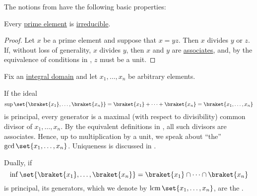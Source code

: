 \begin{proposition}\label{thm:def:domain_divisibility/properties}
  The notions from  have the following basic properties:
  \begin{thmenum}
     Every \hyperref[def:domain_divisibility/prime]{prime element} is \hyperref[def:domain_divisibility/irreducible]{irreducible}.
  \end{thmenum}
\end{proposition}
\begin{proof}
   Let \( x \) be a prime element and suppose that \( x = yz \). Then \( x \) divides \( y \) or \( z \). If, without loss of generality, \( x \) divides \( y \), then \( x \) and \( y \) are \hyperref[def:divisibility/associates]{associates}, and, by the equivalence of conditions in , \( z \) must be a unit.
\end{proof}

\begin{definition}\label{def:gcd_and_lcm}\mimprovised
  Fix an \hyperref[def:integral_domain]{integral domain} and let \( x_1, \ldots, x_n \) be arbitrary elements.

  If the ideal
  \begin{equation*}
    \sup\set{ \braket{ x_1 }, \ldots, \braket{ x_n } } = \braket{ x_1 } + \cdots + \braket{ x_n } = \braket{ x_1, \ldots, x_n }
  \end{equation*}
  is principal, every generator is a maximal (with respect to divisibility) common divisor of \( x_1, \ldots, x_n \). By the equivalent definitions in , all such divisors are associates. Hence, up to multiplication by a unit, we speak about \enquote{the}  \( \gcd\set{ x_1, \ldots, x_n } \). Uniqueness is discussed in .

  Dually, if
  \begin{equation*}
    \inf\set{ \braket{ x_1 }, \ldots, \braket{ x_n } } = \braket{ x_1 } \cap \cdots \cap \braket{ x_n }
  \end{equation*}
  is principal, its generators, which we denote by \( \lcm\set{ x_1, \ldots, x_n } \), are the .
\end{definition}

